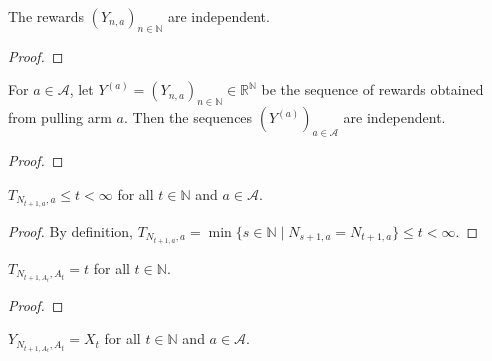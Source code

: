 \begin{lemma}\label{lem:iIndepFun_rewardByCount}
  \leanok
The rewards $(Y_{n,a})_{n \in \mathbb{N}}$ are independent.
\end{lemma}

\begin{proof}

\end{proof}


\begin{lemma}\label{lem:independent_rewardByCount}
For $a \in \mathcal{A}$, let $Y^{(a)} = (Y_{n,a})_{n \in \mathbb{N}} \in \mathbb{R}^{\mathbb{N}}$ be the sequence of rewards obtained from pulling arm $a$. Then the sequences $(Y^{(a)})_{a \in \mathcal{A}}$ are independent.
\end{lemma}

\begin{proof}

\end{proof}


\begin{lemma}\label{lem:stepsUntil_pullCount_le}
  \leanok
$T_{N_{t+1, a}, a} \le t < \infty$ for all $t \in \mathbb{N}$ and $a \in \mathcal{A}$.
\end{lemma}

\begin{proof}\leanok
By definition, $T_{N_{t+1,a}, a} = \min\{s \in \mathbb{N} \mid N_{s+1,a} = N_{t+1,a}\} \le t < \infty$.
\end{proof}


\begin{lemma}\label{lem:stepsUntil_pullCount_eq}
  \leanok
$T_{N_{t+1, A_t}, A_t} = t$ for all $t \in \mathbb{N}$.
\end{lemma}

\begin{proof}\leanok

\end{proof}


\begin{lemma}\label{lem:rewardByCount_pullCount}
  \leanok
$Y_{N_{t+1, A_t}, A_t} = X_t$ for all $t \in \mathbb{N}$ and $a \in \mathcal{A}$.
\end{lemma}

